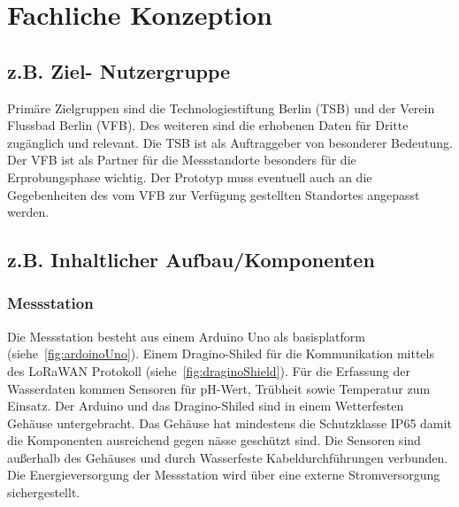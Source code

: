 \section{Fachliche Konzeption}


\subsection{z.B. Ziel- Nutzergruppe}

Primäre Zielgruppen sind die Technologiestiftung Berlin (TSB) und der Verein Flussbad Berlin (VFB). Des weiteren sind die erhobenen Daten für Dritte zugänglich und relevant. Die TSB ist als Auftraggeber von besonderer Bedeutung. Der VFB ist als Partner für die Messstandorte besonders für die Erprobungsphase wichtig. Der Prototyp muss eventuell auch an die Gegebenheiten des vom VFB zur Verfügung gestellten Standortes angepasst werden.

\subsection{z.B. Inhaltlicher Aufbau/Komponenten}


\subsubsection{Messstation}
Die Messstation besteht aus einem Arduino Uno als basisplatform (siehe~\autoref{fig:ardoinoUno}). Einem Dragino-Shiled für die Kommunikation mittels des LoRaWAN Protokoll (siehe~\autoref{fig:draginoShield}). Für die Erfassung der Wasserdaten kommen Sensoren für pH-Wert, Trübheit sowie Temperatur zum Einsatz. Der Arduino und das Dragino-Shiled sind in einem Wetterfesten Gehäuse untergebracht. Das Gehäuse hat mindestens die Schutzklasse IP65 damit die Komponenten ausreichend gegen nässe geschützt sind. Die Sensoren sind außerhalb des Gehäuses und durch Wasserfeste Kabeldurchführungen verbunden. Die Energieversorgung der Messstation wird über eine externe Stromversorgung sichergestellt.

